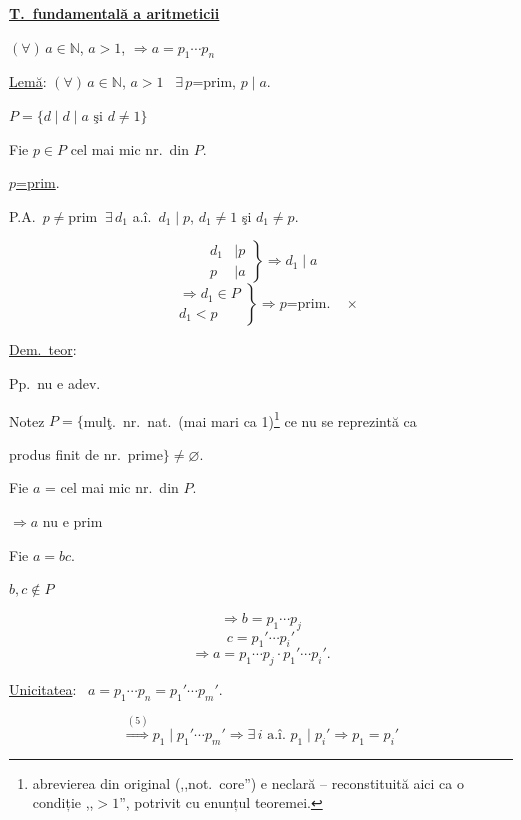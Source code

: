 \documentclass[12pt]{article}
\begin{document}
\noindent\underline{\textbf{T.\ fundamentală a aritmeticii}}

\bigskip
\noindent $(\forall)\,a\in\mathbb{N}$, $a>1$, $\Rightarrow a=p_1\cdots p_n$


\bigskip
\noindent\underline{Lemă}: $(\forall)\,a\in\mathbb{N}$, $a>1$ \ $\exists\,p$=prim, $p\mid a$.

\bigskip
\noindent $P=\{d \mid d\mid a \text{ şi } d\neq 1\}$

\bigskip
\noindent Fie $p\in P$ cel mai mic nr.\ din $P$.

\noindent\underline{$p$=prim}.

\bigskip
\noindent P.A.\ $p\neq$prim $\ \exists\,d_1$ a.î.\ $d_1\mid p$, $d_1\neq 1$ şi $d_1\neq p$.

\[
\left.\begin{aligned} d_1&\mid p\\ p&\mid a\end{aligned}\right\} \Rightarrow d_1\mid a
\]
\[
\left.\begin{aligned} &\Rightarrow d_1\in P\\ &d_1<p\end{aligned}\right\} \Rightarrow p\text{=prim.} \quad \times
\]

\bigskip
\noindent\underline{Dem.\ teor}:

\noindent Pp.\ nu e adev.

\noindent Notez $P=\big\{$mulţ.\ nr.\ nat.\ (mai mari ca 1)\footnote{abrevierea din original (,,not.\ core'') e neclară -- reconstituită aici ca o condiție ,,$>1$'', potrivit cu enunțul teoremei.} ce nu se reprezintă ca

\noindent produs finit de nr.\ prime$\big\} \neq \varnothing$.

\bigskip
\noindent Fie $a$ = cel mai mic nr.\ din $P$.

\noindent $\Rightarrow a$ nu e prim

\bigskip
\noindent Fie $a=bc$.

\noindent $b,c\notin P$

\[
\Rightarrow b=p_1\cdots p_j
\]
\[
c=p_1'\cdots p_i'
\]
\[
\Rightarrow a = p_1\cdots p_j\cdot p_1'\cdots p_i'.
\]

\bigskip
\noindent\underline{Unicitatea}: \ $a = p_1\cdots p_n = p_1'\cdots p_m'$.

\[
\overset{(5)}{\Longrightarrow} p_1\mid p_1'\cdots p_m' \Rightarrow \exists\, i \text{ a.î. } p_1\mid p_i' \Rightarrow p_1=p_i'
\]
\end{document}

